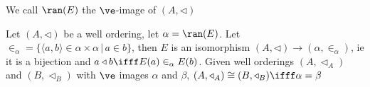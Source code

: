 \noindent
We call $\ran(E)$ the $\ve$-image of $(A, \triangleleft)$ 

\begin{theorem}
    Let $(A, \triangleleft)$ be a well ordering, let $\alpha = \ran(E)$. Let $\in_{\alpha} = \{\langle a, b \rangle \in \alpha \times \alpha \, | \, a \in b\}$, then $E$ is an isomorphism $(A, \triangleleft) \to (\alpha, \in_{\alpha})$, ie it is a bijection and $a \triangleleft b \ifff E(a) \in_{\alpha} E(b)$. Given well orderings $(A, \triangleleft_A)$ and $(B, \triangleleft_B)$ with $\ve$ images $\alpha$ and $\beta$, $(A, \triangleleft_A) \cong (B, \triangleleft_B) \ifff \alpha = \beta$ 
\end{theorem}